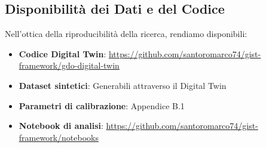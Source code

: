 




\subsection*{Disponibilità dei Dati e del Codice}

Nell'ottica della riproducibilità della ricerca, rendiamo disponibili:
\begin{itemize}
    \item \textbf{Codice Digital Twin}: \url{https://github.com/santoromarco74/gist-framework/gdo-digital-twin}
    \item \textbf{Dataset sintetici}: Generabili attraverso il Digital Twin
    \item \textbf{Parametri di calibrazione}: Appendice B.1
    \item \textbf{Notebook di analisi}: \url{https://github.com/santoromarco74/gist-framework/notebooks}
\end{itemize}

